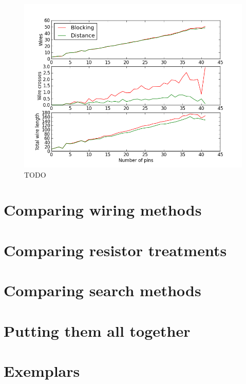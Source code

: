 \begin{figure}
\begin{center}
\includegraphics[width=\textwidth]{Images/placement_quality_trend_comparison.png}
\caption{TODO}
\label{fig:placement_quality_trend}
\end{center}
\end{figure}

\section{Comparing wiring methods}

\section{Comparing resistor treatments}

\section{Comparing search methods}

\section{Putting them all together}

\section{Exemplars}
